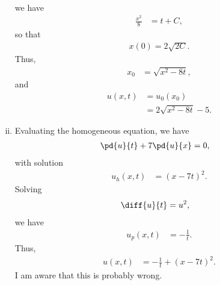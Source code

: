 \documentclass[10pt]{mypackage}
\begin{document}
\begin{solution}
\begin{enumerate}[(i)]
\begin{align*}
      \end{align*}
      we have
      \begin{align*}
        \frac{x^2}{8} &= t + C,
      \end{align*}
      so that
      \begin{align*}
        x(0) = 2\sqrt{2C}.
      \end{align*}
      Thus,
      \begin{align*}
        x_0 &= \sqrt{x^2-8t},
      \end{align*}
      and
      \begin{align*}
        u\left( x,t \right) &= u_0\left( x_0 \right)\\
                            &= 2\sqrt{x^2-8t} - 5.
      \end{align*}
    \item Evaluating the homogeneous equation, we have
      \begin{align*}
        \pd{u}{t} + 7 \pd{u}{x} &= 0,
      \end{align*}
      with solution
      \begin{align*}
        u_h\left( x,t \right) &= \left( x-7t \right)^2.
      \end{align*}
      Solving
      \begin{align*}
        \diff{u}{t} &= u^2,
      \end{align*}
      we have
      \begin{align*}
        u_p(x,t) &= -\frac{1}{t}.
      \end{align*}
      Thus,
      \begin{align*}
        u\left( x,t \right) &= -\frac{1}{t} + \left( x-7t \right)^2.
      \end{align*}
      I am aware that this is probably wrong.
  \end{enumerate}
\end{solution}
\end{document}
